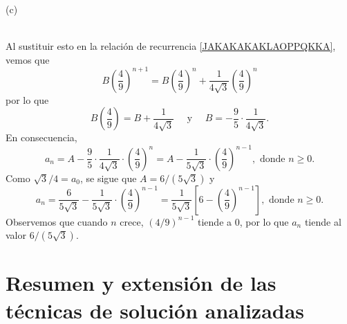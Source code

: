 \begin{myexample}
\begin{minipage}[c]{0.25\textwidth}
\begin{center}
            (c)

            \label{fig:KOCH}
        \end{center}
    \end{minipage}\\[-0.1cm]
    
    Al sustituir esto en la relación de recurrencia \eqref{JAKAKAKAKLAOPPQKKA}, vemos que
    $$B \left(\frac{4}{9}\right)^{n+1} = B \left(\frac{4}{9}\right)^n + \frac{1}{4 \sqrt{3}} \left(\frac{4}{9}\right)^n$$
    por lo que
    $$B\left(\frac{4}{9}\right) = B + \frac{1}{4 \sqrt{3}} \quad \text{ y } \quad B = -\frac{9}{5} \cdot \frac{1}{4 \sqrt{3}}.$$
    En consecuencia,
    $$a_n = A - \frac{9}{5} \cdot \frac{1}{4 \sqrt{3}} \cdot \left(\frac{4}{9}\right)^n = A - \frac{1}{5 \sqrt{3}} \cdot \left(\frac{4}{9}\right)^{n-1}, \text{ donde } n \geq 0.$$
    Como $\sqrt{3} / 4 = a_0$, se sigue que $A = 6 /(5 \sqrt{3})$
    y
    $$a_n = \frac{6}{5 \sqrt{3}} - \frac{1}{5 \sqrt{3}} \cdot \left(\frac{4}{9}\right)^{n-1} = \frac{1}{5 \sqrt{3}} \left[6 - \left(\frac{4}{9}\right)^{n-1}\right], \text{ donde } n \geq 0.$$
    Observemos que cuando $n$ crece, $(4/9)^{n-1}$ tiende a 0, por lo que $a_n$ tiende al valor $6 /(5 \sqrt{3})$.
\end{myexample}

\newpage

\section*{Resumen y extensión de las técnicas de solución analizadas}


